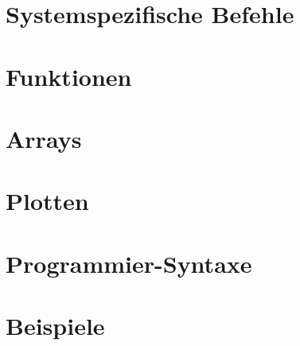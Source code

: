 
  

\section{Systemspezifische Befehle}
	

\section{Funktionen}
  
  

\section{Arrays}
  
  
\section{Plotten}
  
  
\section{Programmier-Syntaxe}
  

\section{Beispiele}
  

